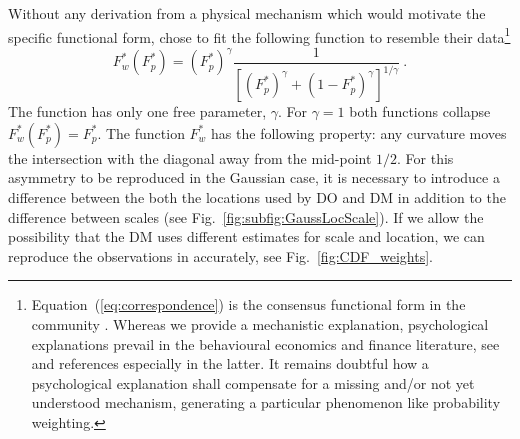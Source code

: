 \documentclass[a4paper, 12pt]{article}
\newcommand{\elabel}[1]{\label{eq:#1}}
\newcommand{\eref}[1]{(Eq.~\ref{eq:#1})}
\newcommand{\Eref}[1]{Equation~(\ref{eq:#1})}
\newcommand{\flabel}[1]{\label{fig:#1}}
\newcommand{\fref}[1]{Fig.~\ref{fig:#1}}
\newcommand{\be}{\begin{equation}}
\newcommand{\ee}{\end{equation}}
\begin{document}
Without any derivation from a physical mechanism which would motivate the specific functional form, \cite{TverskyKahneman1992} chose to fit the following function to resemble their data\footnote{\Eref{correspondence} is the consensus functional form in the community \cite{Barberis2013}. Whereas we provide a mechanistic explanation, psychological explanations prevail in the behavioural economics and finance literature, see \cite{WuGonzalez1996,Prelec1998,GonzalezWu1999,Stott2006,DeGiorgi2006,Wakker2010,AbdellaouiETAL2011} and references especially in the latter. It remains doubtful how a psychological explanation shall compensate for a missing and/or not yet understood mechanism, generating a particular phenomenon like probability weighting.}
% 
\be
\elabel{correspondence}
F_w^*\left(F_p^*\right) = \left(F_p^*\right)^\gamma \frac{1}{\left[\left(F_p^*\right)^\gamma+\left(1-F_p^*\right)^\gamma\right]^{1/\gamma}} ~.
\ee
% 
The function 
has only one free parameter, $\gamma$. For $\gamma=1$ both functions collapse $F_w^*\left(F_p^*\right)=F_p^*$. The function $F_w^*$ has the following property: any curvature moves the intersection with the diagonal away from the mid-point $1/2$. For this asymmetry to be reproduced in the Gaussian case, it is necessary to introduce a difference between the both the locations used by DO and DM in addition to the difference between scales (see \fref{subfig:GaussLocScale}). If we allow the possibility that the DM uses different estimates for scale and location, we can reproduce the observations in \cite{TverskyKahneman1992} accurately, see \fref{CDF_weights}.


\end{document}
